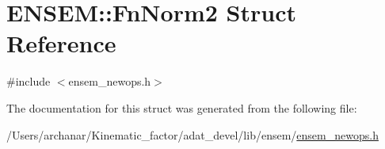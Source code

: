 \hypertarget{structENSEM_1_1FnNorm2}{}\section{E\+N\+S\+EM\+:\+:Fn\+Norm2 Struct Reference}
\label{structENSEM_1_1FnNorm2}


{\ttfamily \#include $<$ensem\+\_\+newops.\+h$>$}



The documentation for this struct was generated from the following file\+:\begin{DoxyCompactItemize}
\item 
/\+Users/archanar/\+Kinematic\+\_\+factor/adat\+\_\+devel/lib/ensem/\mbox{\hyperlink{lib_2ensem_2ensem__newops_8h}{ensem\+\_\+newops.\+h}}\end{DoxyCompactItemize}

